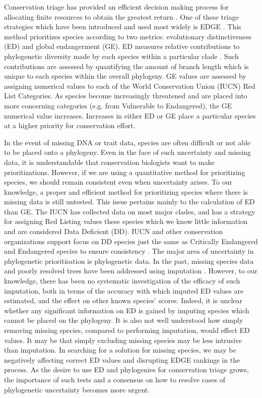 \documentclass[12pt,english]{article}
\begin{document}
Conservation triage has provided an efficient decision making process
for allocating finite resources to obtain the greatest return
\autocite{Bottrill2008}. One of these triage strategies which have been
introduced and used most widely is EDGE \autocite{isaac2007mammals}. This
method prioritizes species according to two metrics: evolutionary
distinctiveness (ED) and global endangerment (GE). ED measures
relative contributions to phylogenetic diversity made by each species
within a particular clade \autocite{isaac2007mammals}. Such contributions are
assessed by quantifying the amount of branch length which is unique to
each species within the overall phylogeny. GE values are assessed by
assigning numerical values to each of the World Conservation Union
(IUCN) Red List Categories. As species become increasingly threatened
and are placed into more concerning categories (e.g. from Vulnerable
to Endangered), the GE numerical value increases. Increases in either
ED or GE place a particular species at a higher priority for
conservation effort.

In the event of missing DNA or trait data, species are often difficult
or not able to be placed onto a phylogeny. Even in the face of such
uncertainty and missing data, it is understandable that conservation
biologists want to make prioritizations. However, if we are using a
quantitative method for prioritizing species, we should remain
consistent even when uncertainty arises. To our knowledge, a proper
and efficient method for prioritizing species where there is missing
data is still untested. This issue pertains mainly to the calculation
of ED than GE. The IUCN has collected data on most major clades, and
has a strategy for assigning Red Listing values these species which we
know little information and are considered Data Deficient (DD). IUCN
and other conservation organizations support focus on DD species just
the same as Critically Endangered and Endangered species to ensure
consistency \autocite{Rodrigues2006}. The major area of uncertainty in
phylogenetic prioritisation is phylogenetic data. In the past, missing
species data and poorly resolved trees have been addressed using
imputation \autocite{collen2011investing, isaac2012phylogenetically, jetz2014global}. However, to our knowledge, there has been no systematic
investigation of the efficacy of such imputation, both in terms of the
accuracy with which imputed ED values are estimated, and the effect on
other known species’ scores. Indeed, it is unclear whether any
significant information on ED is gained by imputing species which
cannot be placed on the phylogeny. It is also not well understood how
simply removing missing species, compared to performing imputation,
would effect ED values. It may be that simply excluding missing
species may be less intrusive than imputation. In searching for a
solution for missing species, we may be negatively affecting correct
ED values and disrupting EDGE rankings in the process. As the desire
to use ED and phylogenies for conservation triage grows, the
importance of such tests and a consensus on how to resolve cases of
phylogenetic uncertainty becomes more urgent.
\end{document}
